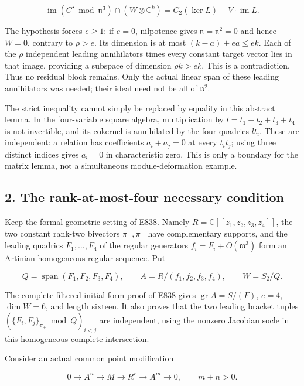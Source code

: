 \[
 \operatorname{im}(C'\bmod\mathfrak n^3)\cap(W\otimes\mathbb C^k)
   =C_2(\ker L)+V\cdot\operatorname{im}L.
 \tag{E839.3}
\]

The hypothesis forces \(e\ge1\): if \(e=0\), nilpotence gives
\(\mathfrak n=\mathfrak n^2=0\) and hence \(W=0\), contrary to
\(\rho>e\). Its dimension is at most \((k-a)+ea\le ek\). Each of the \(\rho\)
independent leading annihilators times every constant target vector lies
in that image, providing a subspace of dimension \(\rho k>ek\). This is
a contradiction. Thus no residual block remains. Only the actual linear
span of these leading annihilators was needed; their ideal need not be
all of \(\mathfrak n^2\).

The strict inequality cannot simply be replaced by equality in this
abstract lemma. In the four-variable square algebra, multiplication by
\(l=t_1+t_2+t_3+t_4\) is not invertible, and its cokernel is annihilated
by the four quadrics \(lt_i\). These are independent: a relation has
coefficients \(a_i+a_j=0\) at every \(t_it_j\); using three distinct
indices gives \(a_i=0\) in characteristic zero. This is only a boundary
for the matrix lemma, not a simultaneous module-deformation example.

\subsection{2. The rank-at-most-four necessary
condition}\label{SF-E839:the-rank-at-most-four-necessary-condition}

Keep the formal geometric setting of E838. Namely
\(R=\mathbb C[[z_1,z_2,z_3,z_4]]\), the two constant rank-two bivectors
\(\pi_+,\pi_-\) have complementary supports, and the leading quadrics
\(F_1,\ldots,F_4\) of the regular generators
\(f_i=F_i+O(\mathfrak m^3)\) form an Artinian homogeneous regular
sequence. Put

\[
 Q=\operatorname{span}(F_1,F_2,F_3,F_4),\qquad
 A=R/(f_1,f_2,f_3,f_4),\qquad W=S_2/Q.
 \tag{E839.4}
\]

The complete filtered initial-form proof of E838 gives
\(\operatorname{gr}A=S/(F)\), \(e=4\), \(\dim W=6\), and length sixteen.
It also proves that the two leading bracket tuples
\((\{F_i,F_j\}_{\pi_\pm}\bmod Q)_{i<j}\) are independent, using the
nonzero Jacobian socle in this homogeneous complete intersection.

Consider an actual common point modification

\[
 0\longrightarrow A^n\longrightarrow M\longrightarrow R^r
       \longrightarrow A^m\longrightarrow0,\qquad m+n>0.
 \tag{E839.5}
\]

